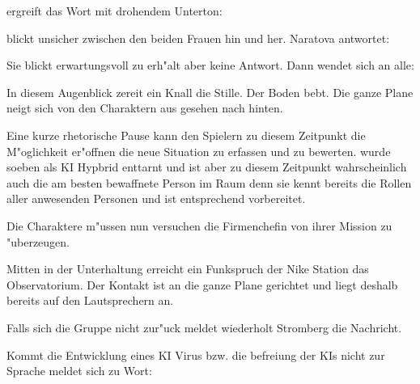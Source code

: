 
\xl{} ergreift das Wort mit drohendem Unterton:


\ml{} blickt unsicher zwischen den beiden Frauen hin und her. Naratova antwortet:


Sie blickt erwartungsvoll zu \xl{} erh"alt aber keine Antwort. Dann wendet sich an alle:


In diesem Augenblick zerei\3t ein Knall die Stille. Der Boden bebt. Die ganze Plane neigt sich von den Charaktern aus gesehen nach hinten. 

Eine kurze rhetorische Pause kann den Spielern zu diesem Zeitpunkt die M"oglichkeit er"offnen die neue Situation zu erfassen und zu bewerten. \xl{} wurde soeben als KI Hypbrid enttarnt und ist aber zu diesem Zeitpunkt wahrscheinlich auch die am besten bewaffnete Person im Raum denn sie kennt bereits die Rollen aller anwesenden Personen und ist entsprechend vorbereitet. 

Die Charaktere m"ussen nun versuchen die Firmenchefin von ihrer Mission zu "uberzeugen.

Mitten in der Unterhaltung erreicht ein Funkspruch der Nike Station das Observatorium. Der Kontakt ist an die ganze Plane gerichtet und liegt deshalb bereits auf den Lautsprechern an.


Falls sich die Gruppe nicht zur"uck meldet wiederholt Stromberg die Nachricht.

Kommt die Entwicklung eines KI Virus bzw. die befreiung der KIs nicht zur Sprache meldet sich \ml{} zu Wort:

